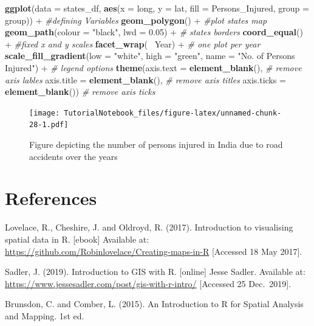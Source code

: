 \documentclass[]{article}
\newenvironment{Shaded}{}{}
\newcommand{\CommentTok}[1]{\textcolor[rgb]{0.38,0.63,0.69}{\textit{#1}}}
\newcommand{\DataTypeTok}[1]{\textcolor[rgb]{0.56,0.13,0.00}{#1}}
\newcommand{\FloatTok}[1]{\textcolor[rgb]{0.25,0.63,0.44}{#1}}
\newcommand{\KeywordTok}[1]{\textcolor[rgb]{0.00,0.44,0.13}{\textbf{#1}}}
\newcommand{\NormalTok}[1]{#1}
\newcommand{\OperatorTok}[1]{\textcolor[rgb]{0.40,0.40,0.40}{#1}}
\newcommand{\StringTok}[1]{\textcolor[rgb]{0.25,0.44,0.63}{#1}}
\begin{document}
\begin{Shaded}
\begin{Highlighting}[]
\KeywordTok{ggplot}\NormalTok{(}\DataTypeTok{data =}\NormalTok{ states_df,}
       \KeywordTok{aes}\NormalTok{(}\DataTypeTok{x =}\NormalTok{ long, }\DataTypeTok{y =}\NormalTok{ lat, }\DataTypeTok{fill =}\NormalTok{ Persons_Injured, }\DataTypeTok{group =}\NormalTok{ group)) }\OperatorTok{+}\StringTok{ }\CommentTok{#defining Variables}
\StringTok{  }\KeywordTok{geom_polygon}\NormalTok{() }\OperatorTok{+}\StringTok{ }\CommentTok{#plot states map}
\StringTok{  }\KeywordTok{geom_path}\NormalTok{(}\DataTypeTok{colour =} \StringTok{"black"}\NormalTok{, }\DataTypeTok{lwd =} \FloatTok{0.05}\NormalTok{) }\OperatorTok{+}\StringTok{ }\CommentTok{# states borders}
\StringTok{  }\KeywordTok{coord_equal}\NormalTok{() }\OperatorTok{+}\StringTok{ }\CommentTok{#fixed x and y scales}
\StringTok{  }\KeywordTok{facet_wrap}\NormalTok{(}\OperatorTok{~}\StringTok{ }\NormalTok{Year) }\OperatorTok{+}\StringTok{ }\CommentTok{# one plot per year}
\StringTok{  }\KeywordTok{scale_fill_gradient}\NormalTok{(}\DataTypeTok{low =} \StringTok{"white"}\NormalTok{, }\DataTypeTok{high =} \StringTok{"green"}\NormalTok{,}
                      \DataTypeTok{name =} \StringTok{"No. of Persons Injured"}\NormalTok{) }\OperatorTok{+}\StringTok{ }\CommentTok{# legend options}
\StringTok{  }\KeywordTok{theme}\NormalTok{(}\DataTypeTok{axis.text =} \KeywordTok{element_blank}\NormalTok{(), }\CommentTok{# remove axis lables}
        \DataTypeTok{axis.title =} \KeywordTok{element_blank}\NormalTok{(), }\CommentTok{# remove axis titles}
        \DataTypeTok{axis.ticks =} \KeywordTok{element_blank}\NormalTok{()) }\CommentTok{# remove axis ticks}
\end{Highlighting}
\end{Shaded}

\begin{figure}
\centering
\texttt{[image: TutorialNotebook\_files/figure-latex/unnamed-chunk-28-1.pdf]}
\caption{Figure depicting the number of persons injured in India due to
road accidents over the years}
\end{figure}

\clearpage

\hypertarget{references}{%
\section{References}\label{references}}

Lovelace, R., Cheshire, J. and Oldroyd, R. (2017). Introduction to
visualising spatial data in R. {[}ebook{]} Available at:
\url{https://github.com/Robinlovelace/Creating-maps-in-R} {[}Accessed 18
May 2017{]}.

Sadler, J. (2019). Introduction to GIS with R. {[}online{]} Jesse
Sadler. Available at:
\url{https://www.jessesadler.com/post/gis-with-r-intro/} {[}Accessed 25
Dec.~2019{]}.

Brunsdon, C. and Comber, L. (2015). An Introduction to R for Spatial
Analysis and Mapping. 1st ed.
\end{document}
